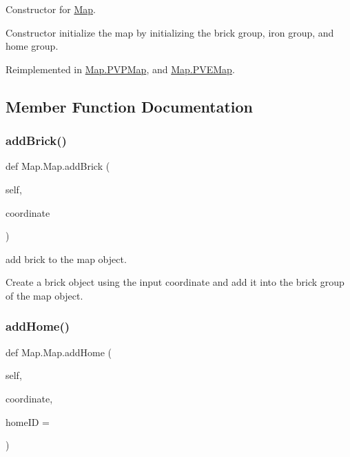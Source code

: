 Constructor for \mbox{\hyperlink{class_map_1_1_map}{Map}}. 

Constructor initialize the map by initializing the brick group, iron group, and home group. 

Reimplemented in \mbox{\hyperlink{class_map_1_1_p_v_p_map_a9d6a84ac6a94e5394a7157f885603a0c}{Map.\+P\+V\+P\+Map}}, and \mbox{\hyperlink{class_map_1_1_p_v_e_map_ae4a033a205c18ef5ba14c47aceb75306}{Map.\+P\+V\+E\+Map}}.



\subsection{Member Function Documentation}
\mbox{\label{class_map_1_1_map_aff66398f6c8d1a6bcb27737cbfc6f7a5}} 
\subsubsection{\texorpdfstring{addBrick()}{addBrick()}}
{\footnotesize\ttfamily def Map.\+Map.\+add\+Brick (\begin{DoxyParamCaption}\item[{}]{self,  }\item[{}]{coordinate }\end{DoxyParamCaption})}



add brick to the map object. 

Create a brick object using the input coordinate and add it into the brick group of the map object. \mbox{\label{class_map_1_1_map_a70217ab9229c2a28f042dae7df33874b}} 
\subsubsection{\texorpdfstring{addHome()}{addHome()}}
{\footnotesize\ttfamily def Map.\+Map.\+add\+Home (\begin{DoxyParamCaption}\item[{}]{self,  }\item[{}]{coordinate,  }\item[{}]{home\+ID = {} }\end{DoxyParamCaption})}



